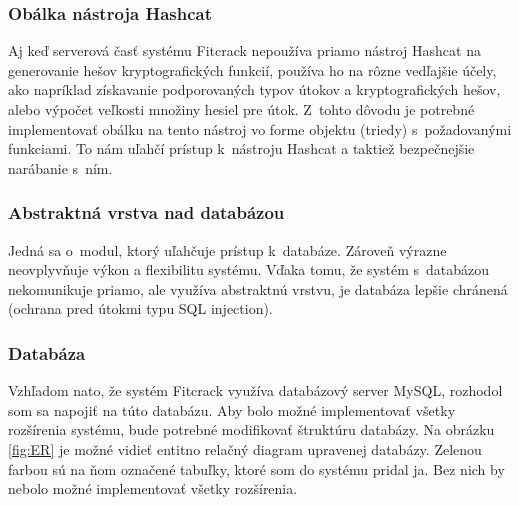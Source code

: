 \documentclass[slovak]{fitthesis}
\begin{document}
\subsubsection{Obálka nástroja Hashcat}
Aj keď serverová časť systému Fitcrack nepoužíva priamo nástroj Hashcat na generovanie hešov kryptografických funkcií, používa ho na rôzne vedľajšie účely, ako napríklad získavanie podporovaných typov útokov a kryptografických hešov, alebo výpočet veľkosti množiny hesiel pre útok. Z~tohto dôvodu je potrebné implementovať obálku na tento nástroj vo forme objektu (triedy) s~požadovanými funkciami. To nám uľahčí prístup k~nástroju Hashcat a taktiež bezpečnejšie narábanie s~ním.

\subsubsection{Abstraktná vrstva nad databázou}
Jedná sa o~modul, ktorý uľahčuje prístup k~databáze. Zároveň výrazne neovplyvňuje výkon a flexibilitu systému. Vďaka tomu, že systém s~databázou nekomunikuje priamo, ale využíva abstraktnú vrstvu, je databáza lepšie chránená (ochrana pred útokmi typu SQL injection).


\subsubsection{Databáza}\label{navrhDB}
Vzhľadom nato, že systém Fitcrack využíva databázový server MySQL, rozhodol som sa napojiť na túto databázu. Aby bolo možné implementovať všetky rozšírenia systému, bude potrebné modifikovať štruktúru databázy. Na obrázku \ref{fig:ER} je možné vidieť entitno relačný diagram upravenej databázy. Zelenou farbou sú na ňom označené tabuľky, ktoré som do systému pridal ja. Bez nich by nebolo možné implementovať všetky rozšírenia.
\end{document}
